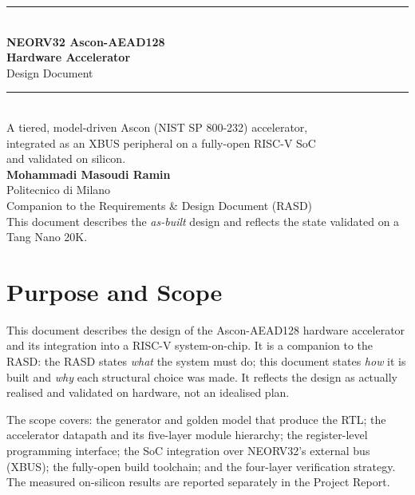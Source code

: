 \documentclass[11pt,a4paper]{article}
\begin{document}

\begin{titlepage}
\centering
\vspace*{2.5cm}
{\color{docblue}\rule{\linewidth}{1.2pt}}\\[0.6cm]
{\Huge\bfseries\color{docblue} NEORV32 Ascon-AEAD128\\[0.2cm] Hardware Accelerator}\\[0.4cm]
{\LARGE\color{doclblue} Design Document}\\[0.3cm]
{\color{docblue}\rule{\linewidth}{1.2pt}}\\[1.2cm]
{\large A tiered, model-driven Ascon (NIST SP 800-232) accelerator,\\
integrated as an XBUS peripheral on a fully-open RISC-V SoC\\
and validated on silicon.}\\[2cm]
{\large\textbf{Mohammadi Masoudi Ramin}}\\[0.3cm]
{\normalsize Politecnico di Milano}\\[0.3cm]
{\normalsize Companion to the Requirements \& Design Document (RASD)}\\
\vfill
{\small This document describes the \emph{as-built} design and reflects the
state validated on a Tang Nano 20K.}
\end{titlepage}

\tableofcontents
\newpage

\section{Purpose and Scope}
This document describes the design of the Ascon-AEAD128 hardware accelerator and
its integration into a RISC-V system-on-chip. It is a companion to the RASD: the
RASD states \emph{what} the system must do; this document states \emph{how} it is
built and \emph{why} each structural choice was made. It reflects the design as
actually realised and validated on hardware, not an idealised plan.

The scope covers: the generator and golden model that produce the RTL; the
accelerator datapath and its five-layer module hierarchy; the register-level
programming interface; the SoC integration over NEORV32's external bus (XBUS);
the fully-open build toolchain; and the four-layer verification strategy. The
measured on-silicon results are reported separately in the Project Report.
\end{document}
